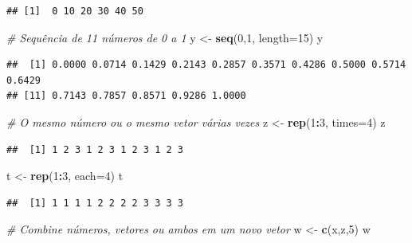 \documentclass[
]{book}
\newenvironment{Shaded}{\begin{snugshade}}{\end{snugshade}}
\newcommand{\AttributeTok}[1]{\textcolor[rgb]{0.13,0.29,0.53}{#1}}
\newcommand{\CommentTok}[1]{\textcolor[rgb]{0.56,0.35,0.01}{\textit{#1}}}
\newcommand{\DecValTok}[1]{\textcolor[rgb]{0.00,0.00,0.81}{#1}}
\newcommand{\FunctionTok}[1]{\textcolor[rgb]{0.13,0.29,0.53}{\textbf{#1}}}
\newcommand{\NormalTok}[1]{#1}
\newcommand{\OtherTok}[1]{\textcolor[rgb]{0.56,0.35,0.01}{#1}}
\newcommand{\SpecialCharTok}[1]{\textcolor[rgb]{0.81,0.36,0.00}{\textbf{#1}}}
\begin{document}
\begin{verbatim}
## [1]  0 10 20 30 40 50
\end{verbatim}

\begin{Shaded}
\begin{Highlighting}[]
\CommentTok{\# Sequência de 11 números de 0 a 1}
\NormalTok{y }\OtherTok{\textless{}{-}} \FunctionTok{seq}\NormalTok{(}\DecValTok{0}\NormalTok{,}\DecValTok{1}\NormalTok{, }\AttributeTok{length=}\DecValTok{15}\NormalTok{)}
\NormalTok{y}
\end{Highlighting}
\end{Shaded}

\begin{verbatim}
##  [1] 0.0000 0.0714 0.1429 0.2143 0.2857 0.3571 0.4286 0.5000 0.5714 0.6429
## [11] 0.7143 0.7857 0.8571 0.9286 1.0000
\end{verbatim}

\begin{Shaded}
\begin{Highlighting}[]
\CommentTok{\# O mesmo número ou o mesmo vetor várias vezes}
\NormalTok{z }\OtherTok{\textless{}{-}} \FunctionTok{rep}\NormalTok{(}\DecValTok{1}\SpecialCharTok{:}\DecValTok{3}\NormalTok{, }\AttributeTok{times=}\DecValTok{4}\NormalTok{)}
\NormalTok{z}
\end{Highlighting}
\end{Shaded}

\begin{verbatim}
##  [1] 1 2 3 1 2 3 1 2 3 1 2 3
\end{verbatim}

\begin{Shaded}
\begin{Highlighting}[]
\NormalTok{t }\OtherTok{\textless{}{-}} \FunctionTok{rep}\NormalTok{(}\DecValTok{1}\SpecialCharTok{:}\DecValTok{3}\NormalTok{, }\AttributeTok{each=}\DecValTok{4}\NormalTok{)}
\NormalTok{t}
\end{Highlighting}
\end{Shaded}

\begin{verbatim}
##  [1] 1 1 1 1 2 2 2 2 3 3 3 3
\end{verbatim}

\begin{Shaded}
\begin{Highlighting}[]
\CommentTok{\# Combine números, vetores ou ambos em um novo vetor}
\NormalTok{w }\OtherTok{\textless{}{-}} \FunctionTok{c}\NormalTok{(x,z,}\DecValTok{5}\NormalTok{)}
\NormalTok{w}
\end{Highlighting}
\end{Shaded}
\end{document}
